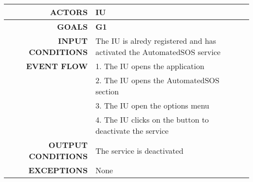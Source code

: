 \begin{table}[h!]
\begin{tabular}{|r|p{3in}|}
\hline
\textbf{ACTORS} & IU\\
\hline
\textbf{GOALS} & \textbf{G1} \\
\hline
\textbf{INPUT CONDITIONS} & The IU is alredy registered and has activated the AutomatedSOS service \\
\hline
\textbf{EVENT FLOW} 
&1. The IU opens the application \\
&2. The IU opens the AutomatedSOS section\\
&3. The IU open the options menu\\
&4. The IU clicks on the button to deactivate the service \\
\hline
\textbf{OUTPUT CONDITIONS} & The service is deactivated  \\
\hline
\textbf{EXCEPTIONS} 
& None \\
\hline
\end{tabular}
\end{table}